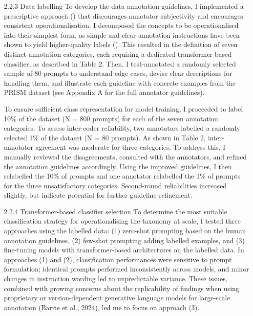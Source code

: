 \documentclass[
  12pt,
]{article}
\begin{document}
2.2.3 Data labelling
To develop the data annotation guidelines, I implemented a prescriptive approach () that discourages annotator subjectivity and encourages consistent operationalisation. I decomposed the concepts to be operationalised into their simplest form, as simple and clear annotation instructions have been shown to yield higher-quality labels (). This resulted in the definition of seven distinct annotation categories, each requiring a dedicated transformer-based classifier, as described in Table 2. Then, I test-annotated a randomly selected sample of 80 prompts to understand edge cases, devise clear descriptions for handling them, and illustrate each guideline with concrete examples from the PRISM dataset (see Appendix A for the full annotator guidelines).

To ensure sufficient class representation for model training, I proceeded to label 10\% of the dataset (N = 800 prompts) for each of the seven annotation categories. To assess inter-coder reliability, two annotators labelled a randomly selected 1\% of the dataset (N = 80 prompts). As shown in Table 2, inter-annotator agreement was moderate for three categories. To address this, I manually reviewed the disagreements, consulted with the annotators, and refined the annotation guidelines accordingly. Using the improved guidelines, I then relabelled the 10\% of prompts and one annotator relabelled the 1\% of prompts for the three unsatisfactory categories. Second-round reliabilities increased slightly, but indicate potential for further guideline refinement.

2.2.4 Transformer-based classifier selection
To determine the most suitable classification strategy for operationalising the taxonomy at scale, I tested three approaches using the labelled data: (1) zero-shot prompting based on the human annotation guidelines, (2) few-shot prompting adding labelled examples, and (3) fine-tuning models with transformer-based architectures on the labelled data. In approaches (1) and (2), classification performances were sensitive to prompt formulation; identical prompts performed inconsistently across models, and minor changes in instruction wording led to unpredictable variance. These issues, combined with growing concerns about the replicability of findings when using proprietary or version-dependent generative language models for large-scale annotation (Barrie et al., 2024), led me to focus on approach (3).
\end{document}
